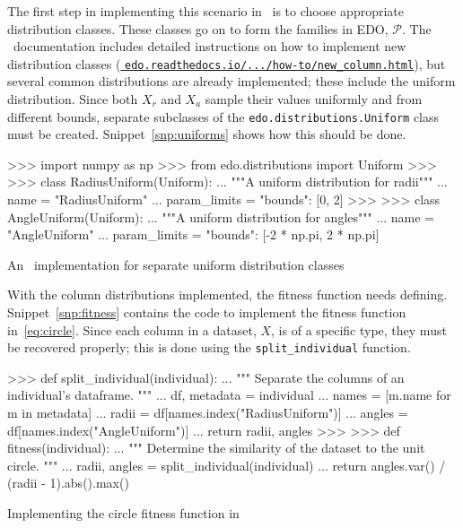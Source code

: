 The first step in implementing this scenario in \edo\ is to choose appropriate
distribution classes. These classes go on to form the families in EDO,
\(\mathcal P\). The \edo\ documentation includes detailed instructions on how to
implement new distribution classes
(\href{https://edo.readthedocs.io/en/latest/how-to/new_column.html}{%
\nolinkurl{edo.readthedocs.io/.../how-to/new\_column.html}}), but several
common distributions are already implemented; these include the uniform
distribution. Since both \(X_r\) and \(X_a\) sample their values uniformly and
from different bounds, separate subclasses of the
\texttt{edo.distributions.Uniform} class must be created.
Snippet~\ref{snp:uniforms} shows how this should be done.

\begin{listing}[htbp]
\begin{usagepy}
>>> import numpy as np
>>> from edo.distributions import Uniform
>>> 
>>> class RadiusUniform(Uniform):
...     """A uniform distribution for radii"""
...     name = "RadiusUniform"
...     param_limits = {"bounds": [0, 2]}
>>> 
>>> class AngleUniform(Uniform):
...     """A uniform distribution for angles"""
...     name = "AngleUniform"
...     param_limits = {"bounds": [-2 * np.pi, 2 * np.pi]}

\end{usagepy}
\caption{An \edo\ implementation for separate uniform distribution classes}
\label{snp:uniforms}
\end{listing}

With the column distributions implemented, the fitness function needs defining.
Snippet~\ref{snp:fitness} contains the code to implement the fitness function
in~\eqref{eq:circle}. Since each column in a dataset, \(X\), is of a specific
type, they must be recovered properly; this is done using the
\texttt{split_individual} function.

\begin{listing}[htbp]
\begin{usagepy}
>>> def split_individual(individual):
...     """ Separate the columns of an individual's dataframe. """
...     df, metadata = individual
...     names = [m.name for m in metadata]
...     radii = df[names.index("RadiusUniform")]
...     angles = df[names.index("AngleUniform")]
...     return radii, angles
>>> 
>>> def fitness(individual):
...     """ Determine the similarity of the dataset to the unit circle. """
...     radii, angles = split_individual(individual)
...     return angles.var() / (radii - 1).abs().max()

\end{usagepy}
\caption{Implementing the circle fitness function in \edo}
\label{snp:fitness}
\end{listing}

